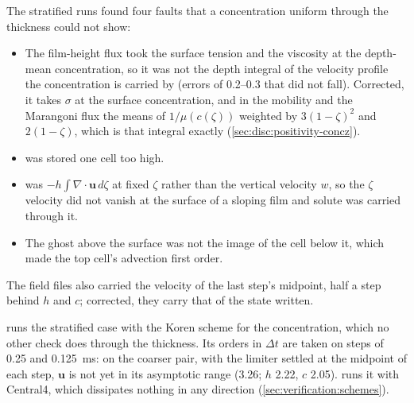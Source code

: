 The stratified  runs found four faults that a concentration uniform
through the thickness could not show:
\begin{itemize}
  \item The film-height flux took the surface tension and the viscosity at
    the depth-mean concentration, so it was not the depth integral of the
    velocity profile the concentration is carried by (errors of 0.2--0.3
    that did not fall). Corrected, it takes $\sigma$ at the surface
    concentration,
    and in the mobility and the Marangoni flux the means of $1/\mu(c(\zeta))$
    weighted by $3(1-\zeta)^2$ and $2(1-\zeta)$, which is that integral
    exactly (\cref{sec:disc:positivity-concz}).
  \item {} was stored one cell too high.
  \item {} was $-h\int\nabla\cdot\mathbf u\,d\zeta$ at fixed $\zeta$
    rather than the vertical velocity $w$, so the $\zeta$ velocity did not
    vanish at the surface of a sloping film and solute was carried through
    it.
  \item The ghost above the surface was not the image of the cell below it,
    which made the top cell's advection first order.
\end{itemize}
The field files also carried the velocity of the last step's midpoint, half
a step behind $h$ and $c$; corrected, they carry that of the state written.

 runs the stratified case with the Koren scheme
for the concentration, which no other check does through the thickness. Its
orders in $\Delta t$ are taken on steps of 0.25 and \SI{0.125}{\milli\second}:
on the coarser pair, with the limiter settled at the midpoint of each
step, $\mathbf u$ is not yet in its asymptotic range (3.26; $h$ 2.22, $c$
2.05).  runs it with Central4, which
dissipates nothing in any direction (\cref{sec:verification:schemes}).

